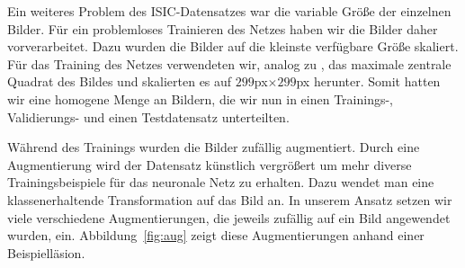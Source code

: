 Ein weiteres Problem des ISIC-Datensatzes war die variable Größe der einzelnen Bilder. Für ein problemloses Trainieren des Netzes haben wir die Bilder daher vorverarbeitet. Dazu wurden die Bilder auf die kleinste verfügbare Größe skaliert. Für das Training des Netzes verwendeten wir, analog zu \citet{esteva2017dermatologist}, das maximale zentrale Quadrat des Bildes und skalierten es auf $299$px$\times 299$px herunter. Somit hatten wir eine homogene Menge an Bildern, die wir nun in einen Trainings-, Validierungs- und einen Testdatensatz unterteilten.

Während des Trainings wurden die Bilder zufällig augmentiert. Durch eine Augmentierung wird der Datensatz künstlich vergrößert um mehr diverse Trainingsbeispiele für das neuronale Netz zu erhalten. Dazu wendet man eine klassenerhaltende Transformation auf das Bild an. In unserem Ansatz setzen wir viele verschiedene Augmentierungen, die jeweils zufällig auf ein Bild angewendet wurden, ein. Abbildung~\ref{fig:aug} zeigt diese Augmentierungen anhand einer Beispielläsion.

